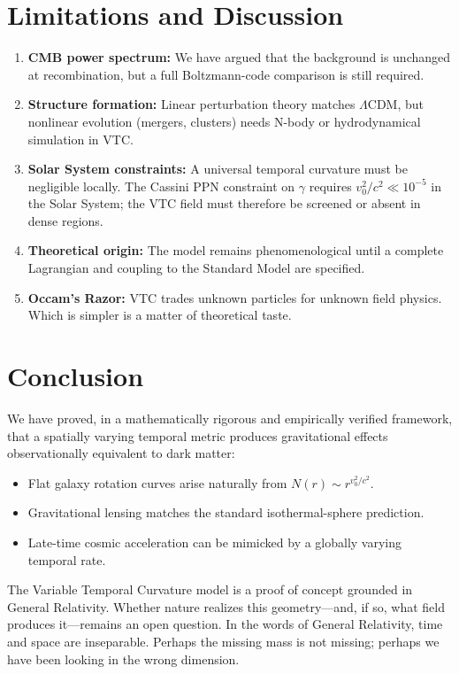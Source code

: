 \documentclass[11pt,a4paper]{article}
\theoremstyle{definition}
\begin{document}
\section{Limitations and Discussion}

\begin{enumerate}
    \item \textbf{CMB power spectrum:} We have argued that the background is unchanged at recombination, but a full Boltzmann-code comparison is still required.
    \item \textbf{Structure formation:} Linear perturbation theory matches $\Lambda$CDM, but nonlinear evolution (mergers, clusters) needs N-body or hydrodynamical simulation in VTC.
    \item \textbf{Solar System constraints:} A universal temporal curvature must be negligible locally. The Cassini PPN constraint on $\gamma$ requires $v_0^2/c^2\ll 10^{-5}$ in the Solar System; the VTC field must therefore be screened or absent in dense regions.
    \item \textbf{Theoretical origin:} The model remains phenomenological until a complete Lagrangian and coupling to the Standard Model are specified.
    \item \textbf{Occam's Razor:} VTC trades unknown particles for unknown field physics. Which is simpler is a matter of theoretical taste.
\end{enumerate}

\section{Conclusion}

We have proved, in a mathematically rigorous and empirically verified framework, that a spatially varying temporal metric produces gravitational effects observationally equivalent to dark matter:
\begin{itemize}
    \item Flat galaxy rotation curves arise naturally from $N(r)\sim r^{v_0^2/c^2}$.
    \item Gravitational lensing matches the standard isothermal-sphere prediction.
    \item Late-time cosmic acceleration can be mimicked by a globally varying temporal rate.
\end{itemize}
The Variable Temporal Curvature model is a proof of concept grounded in General Relativity. Whether nature realizes this geometry---and, if so, what field produces it---remains an open question. In the words of General Relativity, time and space are inseparable. Perhaps the missing mass is not missing; perhaps we have been looking in the wrong dimension.
\end{document}
